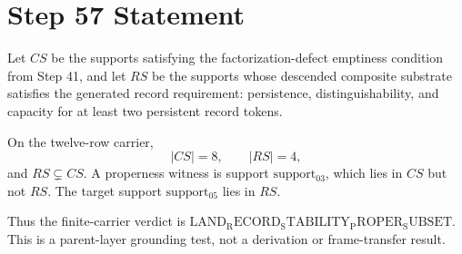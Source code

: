 \documentclass[11pt]{article}
\begin{document}
\section*{Step 57 Statement}
Let \(CS\) be the supports satisfying the factorization-defect emptiness condition from Step 41, and let \(RS\) be the supports whose descended composite substrate satisfies the generated record requirement: persistence, distinguishability, and capacity for at least two persistent record tokens.

On the twelve-row carrier,
\[
  |CS| = 8,\qquad |RS| = 4,
\]
and \(RS \subsetneq CS\). A properness witness is support \(\mathrm{support_03}\), which lies in \(CS\) but not \(RS\). The target support \(\mathrm{support_05}\) lies in \(RS\).

Thus the finite-carrier verdict is \(\mathrm{LAND_RECORD_STABILITY_PROPER_SUBSET}\). This is a parent-layer grounding test, not a derivation or frame-transfer result.
\end{document}
